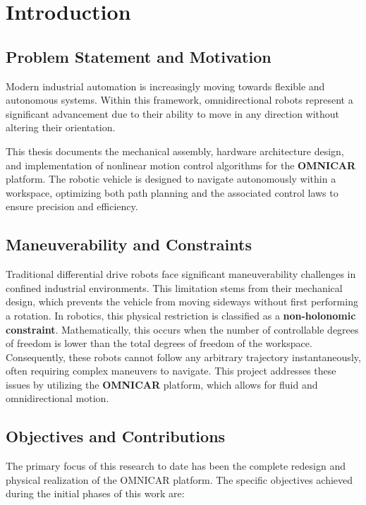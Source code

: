 \chapter{Introduction}
\section{Problem Statement and Motivation}
Modern industrial automation is increasingly moving towards flexible and autonomous systems. Within this framework, omnidirectional robots represent a significant advancement due to their ability to move in any direction without altering their orientation.

This thesis documents the mechanical assembly, hardware architecture design, and implementation of nonlinear motion control algorithms for the \textbf{OMNICAR} platform. The robotic vehicle is designed to navigate autonomously within a workspace, optimizing both path planning and the associated control laws to ensure precision and efficiency.

\section{Maneuverability and Constraints}
Traditional differential drive robots face significant maneuverability challenges in confined industrial environments. This limitation stems from their mechanical design, which prevents the vehicle from moving sideways without first performing a rotation. 
In robotics, this physical restriction is classified as a \textbf{non-holonomic constraint}. Mathematically, this occurs when the number of controllable degrees of freedom is lower than the total degrees of freedom of the workspace. Consequently, these robots cannot follow any arbitrary trajectory instantaneously, often requiring complex maneuvers to navigate. This project addresses these issues by utilizing the \textbf{OMNICAR} platform, which allows for fluid and omnidirectional motion.

\section{Objectives and Contributions}
The primary focus of this research to date has been the complete redesign and physical realization of the OMNICAR platform. The specific objectives achieved during the initial phases of this work are:

